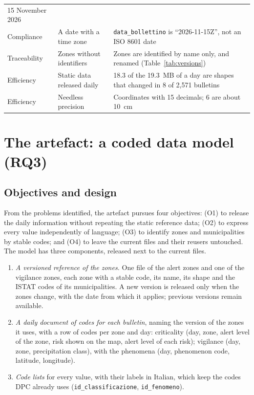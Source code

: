 \documentclass[review,authoryear,12pt]{elsarticle}
\newcommand{\field}[1]{\texttt{#1}}
\begin{document}
\begin{table}[p]
\begin{tabularx}{\linewidth}{@{}p{2.1cm}p{3.2cm}X@{}}
15 November 2026 \\
Compliance & A date with a time zone & \field{data\_bollettino} is
``2026-11-15Z'', not an ISO 8601 date \\
Traceability & Zones without identifiers & Zones are identified by name only,
and renamed (Table~\ref{tab:versions}) \\
Efficiency & Static data released daily & 18.3 of the 19.3~MB of a day are
shapes that changed in 8 of 2,571 bulletins \\
Efficiency & Needless precision & Coordinates with 15 decimals; 6 are about
10~cm \\
\bottomrule
\end{tabularx}
\end{table}

\section{The artefact: a coded data model (RQ3)}
\label{sec:artefact}

\subsection{Objectives and design}
\label{sec:design}

From the problems identified, the artefact pursues four objectives: (O1) to
release the daily information without repeating the static reference data;
(O2) to express every value independently of language; (O3) to identify zones
and municipalities by stable codes; and (O4) to leave the current files and
their reusers untouched. The model has three components, released next to the
current files.

\begin{enumerate}
\item \emph{A versioned reference of the zones.} One file of the alert zones
and one of the vigilance zones, each zone with a stable code, its name, its
shape and the ISTAT codes of its municipalities. A new version is released only
when the zones change, with the date from which it applies; previous versions
remain available.
\item \emph{A daily document of codes for each bulletin}, naming the version of
the zones it uses, with a row of codes per zone and day: criticality (day,
zone, alert level of the zone, risk shown on the map, alert level of each
risk); vigilance (day, zone, precipitation class), with the phenomena (day,
phenomenon code, latitude, longitude).
\item \emph{Code lists} for every value, with their labels in Italian, which
keep the codes DPC already uses (\field{id\_classificazione},
\field{id\_fenomeno}).
\end{enumerate}
\end{document}

